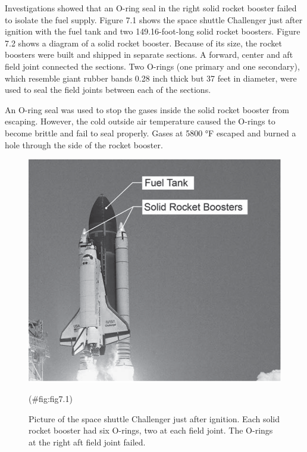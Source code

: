 \documentclass[
]{report}
\begin{document}
Investigations showed that an O-ring seal in the right solid rocket booster failed to isolate the fuel supply. Figure 7.1 shows the space shuttle Challenger just after ignition with the fuel tank and two 149.16-foot-long solid rocket boosters. Figure 7.2 shows a diagram of a solid rocket booster. Because of its size, the rocket boosters were built and shipped in separate sections. A forward, center and aft field joint connected the sections. Two O-rings (one primary and one secondary), which resemble giant rubber bands 0.28 inch thick but 37 feet in diameter, were used to seal the field joints between each of the sections.

An O-ring seal was used to stop the gases inside the solid rocket booster from escaping. However, the cold outside air temperature caused the O-rings to become brittle and fail to seal properly. Gases at 5800 °F escaped and burned a hole through the side of the rocket booster.

\begin{figure}

{\centering \includegraphics[width=1\linewidth]{docs/Fig7_1Rocket} 

}

\caption{Picture of the space shuttle Challenger just after ignition. Each solid rocket booster had six O-rings, two at each field joint. The O-rings at the right aft field joint failed.}(\#fig:fig7.1)
\end{figure}
\end{document}
